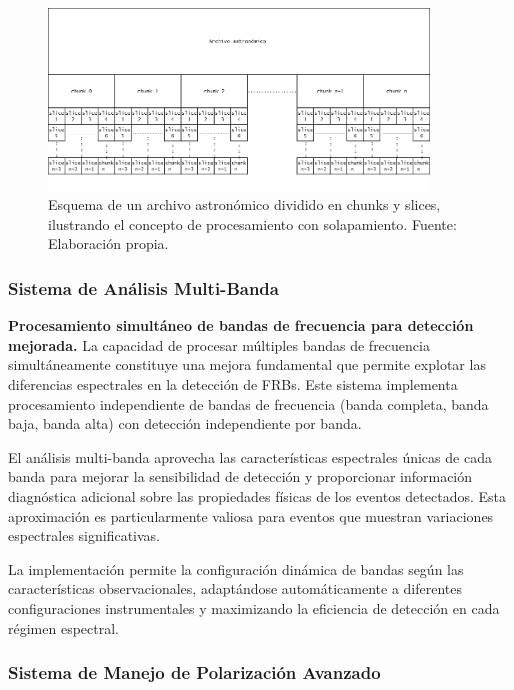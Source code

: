 \begin{figure}[H]
\centering
\includegraphics[width=0.9\textwidth]{figures/sistema-chunks.png}
\caption{Esquema de un archivo astronómico dividido en chunks y slices, ilustrando el concepto de procesamiento con solapamiento. Fuente: Elaboración propia.}
\label{fig:sistema-chunks}
\end{figure}

\subsubsection{Sistema de Análisis Multi-Banda}

\noindent\textbf{Procesamiento simultáneo de bandas de frecuencia para detección mejorada.} La capacidad de procesar múltiples bandas de frecuencia simultáneamente constituye una mejora fundamental que permite explotar las diferencias espectrales en la detección de FRBs. Este sistema implementa procesamiento independiente de bandas de frecuencia (banda completa, banda baja, banda alta) con detección independiente por banda.

El análisis multi-banda aprovecha las características espectrales únicas de cada banda para mejorar la sensibilidad de detección y proporcionar información diagnóstica adicional sobre las propiedades físicas de los eventos detectados. Esta aproximación es particularmente valiosa para eventos que muestran variaciones espectrales significativas.

La implementación permite la configuración dinámica de bandas según las características observacionales, adaptándose automáticamente a diferentes configuraciones instrumentales y maximizando la eficiencia de detección en cada régimen espectral.

\subsubsection{Sistema de Manejo de Polarización Avanzado}

